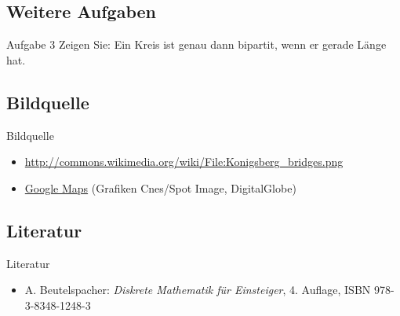 \subsection{Weitere Aufgaben}
\begin{frame}{Aufgabe 3}
Zeigen Sie: Ein Kreis ist genau dann bipartit, wenn er gerade Länge hat.
\end{frame}


\subsection{Bildquelle}
\begin{frame}{Bildquelle}
\begin{itemize}
    \item \href{http://commons.wikimedia.org/wiki/File:Konigsberg\_bridges.png}{http://commons.wikimedia.org/wiki/File:Konigsberg\_bridges.png}
    \item \href{http://goo.gl/maps/WnXRh}{Google Maps} (Grafiken  Cnes/Spot Image, DigitalGlobe)
\end{itemize}
\end{frame}

\subsection{Literatur}
\begin{frame}{Literatur}
\begin{itemize}
    \item A. Beutelspacher: \textit{Diskrete Mathematik für Einsteiger}, 4. Auflage, ISBN 978-3-8348-1248-3
\end{itemize}
\end{frame}
